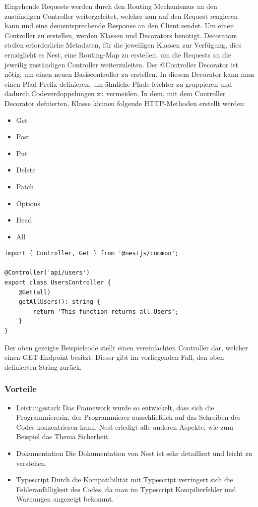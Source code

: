 Eingehende Requests werden durch den Routing Mechanismus an den zuständigen Controller weitergeleitet, welcher nun auf den Request reagieren kann und eine dementsprechende Response an den Client sendet. Um einen Controller zu erstellen, werden Klassen und Decorators benötigt. Decorators stellen erforderliche Metadaten, für die jeweiligen Klassen zur Verfügung, dies ermöglicht es Nest, eine Routing-Map zu erstellen, um die Requests an die jeweilig zuständigen Controller weiterzuleiten.
\newline
Der @Controller Decorator ist nötig, um einen neuen Basiscontroller zu erstellen. In diesem Decorator kann man einen Pfad Prefix definieren, um ähnliche Pfade leichter zu gruppieren und dadurch Codeverdoppelungen zu vermeiden. In dem, mit dem Controller Decorator defnierten, Klasse können folgende HTTP-Methoden erstellt werden:

\begin{itemize}
    \item Get
    \item Post
    \item Put
    \item Delete
    \item Patch
    \item Options
    \item Head
    \item All
\end{itemize}

\begin{lstlisting}[caption=Simpler Controller]
import { Controller, Get } from '@nestjs/common';

@Controller('api/users')
export class UsersController {
    @Get(all)
    getAllUsers(): string {
        return 'This function returns all Users';
    }
}
\end{lstlisting}

Der oben gezeigte Beispielcode stellt einen vereinfachten Controller dar, welcher einen GET-Endpoint besitzt. Dieser gibt im vorliegenden Fall, den oben definierten String zurück.
\cite{Nest_js_Controllers}


\subsubsection{Vorteile}
\begin{itemize}
    \item Leistungsstark
    \newline
    Das Framework wurde so entwickelt, dass sich die Programmiererin, der Programmierer ausschließlich auf das Schreiben des Codes konzentrieren kann. Nest erledigt alle anderen Aspekte, wie zum Beispiel das Thema Sicherheit.
    \item Dokumentation
    \newline
    Die Dokumentation von Nest ist sehr detailliert und leicht zu verstehen.
    \item Typescript
    \newline
    Durch die Kompatibilität mit Typescript verringert sich die Fehleranfälligkeit des Codes, da man im Typescript Kompilierfehler und Warnungen angezeigt bekommt.
\end{itemize}

